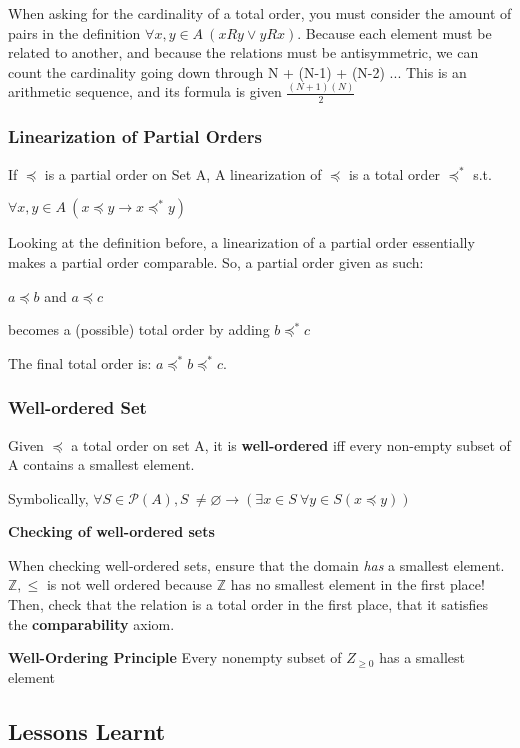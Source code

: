 \documentclass{article}
\newcommand{\sub}[1]{\vspace{10pt}\textbf{#1}}
\begin{document}
When asking for the cardinality of a total order, you must consider the amount of pairs in the definition $\forall x,y \in A\ (xRy\vee yRx)$. Because each element must be related to another, and because the relations must be antisymmetric, we can count the cardinality going down through N + (N-1) + (N-2) ... This is an arithmetic sequence, and its formula is given $\frac{(N+1)(N)}{2}$

\subsubsection{Linearization of Partial Orders}
If $\preccurlyeq$ is a partial order on Set A, A linearization of $\preccurlyeq$ is a total order $\preccurlyeq^*$ s.t.

$\forall x,y \in A\ (x \preccurlyeq y \rightarrow x \preccurlyeq^* y)$

Looking at the definition before, a linearization of a partial order essentially makes a partial order comparable. So, a partial order given as such:

$a \preccurlyeq b$  and $a \preccurlyeq c$

becomes a (possible) total order by adding $b \preccurlyeq^* c$

The final total order is: $a \preccurlyeq^* b \preccurlyeq^* c$.

\subsubsection{Well-ordered Set}
Given $\preccurlyeq$ a total order on set A, it is \textbf{well-ordered} iff every non-empty subset of A contains a smallest element.

Symbolically,
$\forall S \in \mathcal{P}(A), S\ \neq \varnothing \rightarrow (\exists x \in S\ \forall y \in S (x \preccurlyeq y))$

\vspace{10pt}

\textbf{Checking of well-ordered sets}

When checking well-ordered sets, ensure that the domain \textit{has} a smallest element. $\mathbb{Z}, \leq$ is not well ordered because $\mathbb{Z}$ has no smallest element in the first place! Then, check that the relation is a total order in the first place, that it satisfies the \textbf{comparability} axiom.

\sub{Well-Ordering Principle}
Every nonempty subset of $Z_{\geq 0}$ has a smallest element

\subsection{Lessons Learnt}
\end{document}
